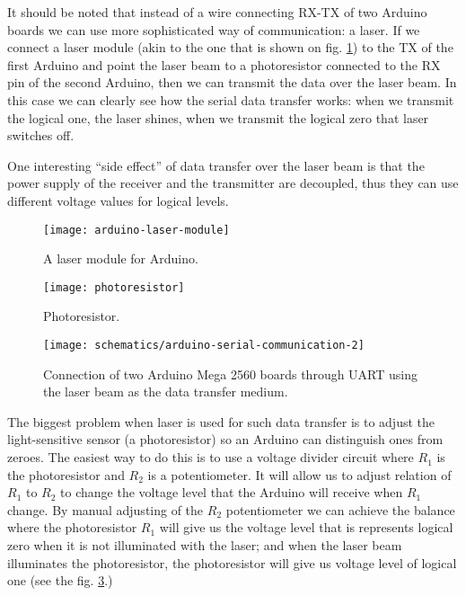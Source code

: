 \documentclass[../sparc.tex]{subfiles}
\begin{document}
It should be noted that instead of a wire connecting RX-TX of two Arduino boards
we can use more sophisticated way of communication: a laser.  If we connect a
laser module (akin to the one that is shown on fig.
\ref{fig:arduino-laser-module}) to the TX of the first Arduino and point the
laser beam to a photoresistor connected to the RX pin of the second Arduino,
then we can transmit the data over the laser beam.  In this case we can clearly
see how the serial data transfer works: when we transmit the logical one, the
laser shines, when we transmit the logical zero that laser switches off.

One interesting ``side effect'' of data transfer over the laser beam is that the
power supply of the receiver and the transmitter are decoupled, thus they can
use different voltage values for logical levels.

\begin{figure}[ht]
  \centering
  \texttt{[image: arduino-laser-module]}
  \caption{A laser module for Arduino.}
  \label{fig:arduino-laser-module}
\end{figure}

\begin{figure}[ht]
  \centering
  \texttt{[image: photoresistor]}
  \caption{Photoresistor.}
  \label{fig:photoresistor}
\end{figure}

\begin{figure}[H]
  \centering
  \texttt{[image: schematics/arduino-serial-communication-2]}
  \caption{Connection of two Arduino Mega 2560 boards through UART using the
    laser beam as the data transfer medium.}
  \label{fig:arduino-serial-communication-2}
\end{figure}

The biggest problem when laser is used for such data transfer is to adjust the
light-sensitive sensor (a photoresistor) so an Arduino can distinguish ones from
zeroes.  The easiest way to do this is to use a voltage divider circuit where
$R_1$ is the photoresistor and $R_2$ is a potentiometer.  It will allow us to
adjust relation of $R_1$ to $R_2$ to change the voltage level that the Arduino
will receive when $R_1$ change.  By manual adjusting of the $R_2$ potentiometer
we can achieve the balance where the photoresistor $R_1$ will give us the
voltage level that is represents logical zero when it is not illuminated with
the laser; and when the laser beam illuminates the photoresistor, the
photoresistor will give us voltage level of logical one (see the
fig. \ref{fig:arduino-serial-communication-2}.)
\end{document}
